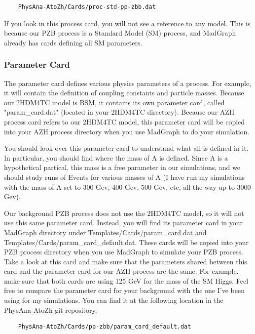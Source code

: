 \documentclass{article}
\begin{document}
\begin{verbatim}
	PhysAna-AtoZh/Cards/proc-std-pp-zbb.dat
\end{verbatim}

If you look in this process card, you will not see a reference to any model. This is because
our PZB process is a Standard Model (SM) process, and MadGraph already has cards defining all SM parameters.

\subsubsection{Parameter Card}

The parameter card defines various physics parameters of a process. For example, it will contain the definition of coupling
constants and particle masses. Because our 2HDM4TC model is BSM, it contains its own parameter card, called "param\_card.dat" (located in your 2HDM4TC directory).
Because our AZH process card refers to our 2HDM4TC model, this parameter card will be copied into your AZH process directory when
you use MadGraph to do your simulation.

\bigskip

You should look over this parameter card to understand what all is defined in it. In
particular, you should find where the mass of A is defined. Since A is a hypothetical partical, this mass is a free parameter
in our simulations, and we should study runs of Events for various masses of A (I have run my simulations with the mass of A
set to 300 Gev, 400 Gev, 500 Gev, etc, all the way up to 3000 Gev).

\bigskip

Our background PZB process does not use the 2HDM4TC model, so it will not use this same parameter card. Instead, you will
find its parameter card in your MadGraph directory under Templates/Cards/param\_card.dat and Templates/Cards/param\_card\_default.dat.
These cards will be copied into your PZB process directory when you use MadGraph to simulate your PZB process. Take a look at this card
and make sure that the parameters shared between this card and the parameter card for our AZH process are the same. For example,
make sure that both cards are using 125 GeV for the mass of the SM Higgs.
Feel free to compare the parameter card for your background with the one I've been using for my simulations. You
can find it at the following location in the PhysAna-AtoZh git repository.

\begin{verbatim}
	PhysAna-AtoZh/Cards/pp-zbb/param_card_default.dat
\end{verbatim}
\end{document}
